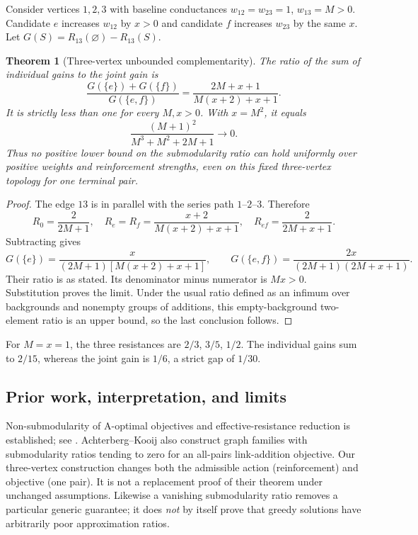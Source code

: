 \documentclass[11pt,a4paper]{article}
\newtheorem{theorem}{Theorem}[section]
\theoremstyle{definition}\newtheorem{definition}[theorem]{Definition}
\theoremstyle{remark}\newtheorem{remark}[theorem]{Remark}
\numberwithin{equation}{section}
\begin{document}
Consider vertices $1,2,3$ with baseline conductances $w_{12}=w_{23}=1$, $w_{13}=M>0$. Candidate $e$ increases $w_{12}$ by $x>0$ and candidate $f$ increases $w_{23}$ by the same $x$. Let $G(S)=R_{13}(\varnothing)-R_{13}(S)$.
\begin{theorem}[Three-vertex unbounded complementarity]\label{T08-triangle}
The ratio of the sum of individual gains to the joint gain is
\[
 \frac{G(\{e\})+G(\{f\})}{G(\{e,f\})}
 =\frac{2M+x+1}{M(x+2)+x+1}.
\]
It is strictly less than one for every $M,x>0$. With $x=M^2$, it equals
\[
 \frac{(M+1)^2}{M^3+M^2+2M+1}\longrightarrow0.
\]
Thus no positive lower bound on the submodularity ratio can hold uniformly over positive weights and reinforcement strengths, even on this fixed three-vertex topology for one terminal pair.
\end{theorem}
\begin{proof}
The edge $13$ is in parallel with the series path $1$--$2$--$3$. Therefore
\[
 R_0=\frac2{2M+1},\quad R_e=R_f=\frac{x+2}{M(x+2)+x+1},\quad R_{ef}=\frac2{2M+x+1}.
\]
Subtracting gives
\[
 G(\{e\})=\frac{x}{(2M+1)[M(x+2)+x+1]},\qquad
 G(\{e,f\})=\frac{2x}{(2M+1)(2M+x+1)}.
\]
Their ratio is as stated. Its denominator minus numerator is $Mx>0$. Substitution proves the limit. Under the usual ratio defined as an infimum over backgrounds and nonempty groups of additions, this empty-background two-element ratio is an upper bound, so the last conclusion follows.
\end{proof}
For $M=x=1$, the three resistances are $2/3$, $3/5$, $1/2$. The individual gains sum to $2/15$, whereas the joint gain is $1/6$, a strict gap of $1/30$.

\subsection{Prior work, interpretation, and limits}\label{T08-sec-5}
Non-submodularity of A-optimal objectives and effective-resistance reduction is established; see \cite{ref051,ref052}. Achterberg--Kooij \cite{ref052} also construct graph families with submodularity ratios tending to zero for an all-pairs link-addition objective. Our three-vertex construction changes both the admissible action (reinforcement) and objective (one pair). It is not a replacement proof of their theorem under unchanged assumptions. Likewise a vanishing submodularity ratio removes a particular generic guarantee; it does \emph{not} by itself prove that greedy solutions have arbitrarily poor approximation ratios.
\end{document}
